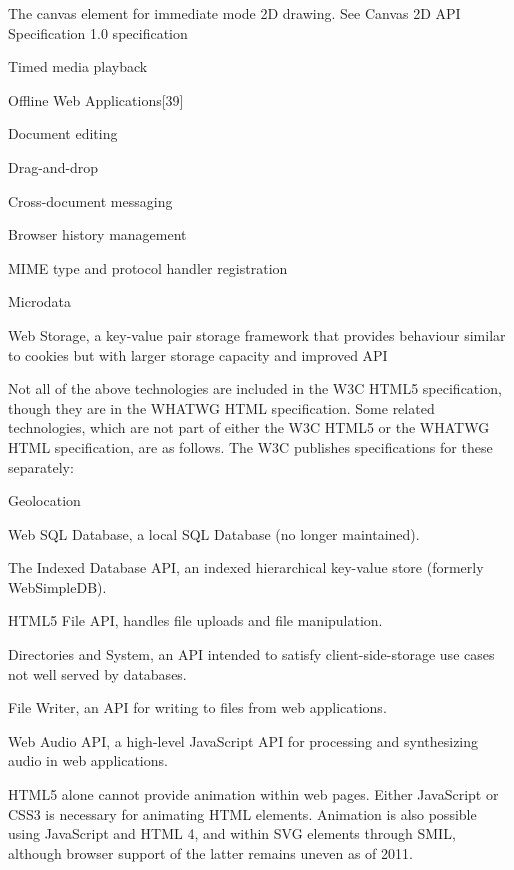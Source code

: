 \begin{compactitem}
\item The canvas element for immediate mode 2D drawing. See Canvas 2D API Specification 1.0 specification
\item Timed media playback
\item Offline Web Applications[39]
\item Document editing
\item Drag-and-drop
\item Cross-document messaging
\item Browser history management
\item MIME type and protocol handler registration
\item Microdata
\item Web Storage, a key-value pair storage framework that provides behaviour similar to cookies but with larger storage capacity and improved API
\end{compactitem}


Not all of the above technologies are included in the W3C HTML5 specification, though they are in the WHATWG HTML specification. Some related technologies, which are not part of either the W3C HTML5 or the WHATWG HTML specification, are as follows. The W3C publishes specifications for these separately:

\begin{compactitem}
\item Geolocation
\item Web SQL Database, a local SQL Database (no longer maintained).
\item The Indexed Database API, an indexed hierarchical key-value store (formerly WebSimpleDB).
\item HTML5 File API, handles file uploads and file manipulation.
\item Directories and System, an API intended to satisfy client-side-storage use cases not well served by databases.
\item File Writer, an API for writing to files from web applications.
\item Web Audio API, a high-level JavaScript API for processing and synthesizing audio in web applications.
\end{compactitem}

HTML5 alone cannot provide animation within web pages. Either JavaScript or CSS3 is necessary for animating HTML elements. Animation is also possible using JavaScript and HTML 4, and within SVG elements through SMIL, although browser support of the latter remains uneven as of 2011.



